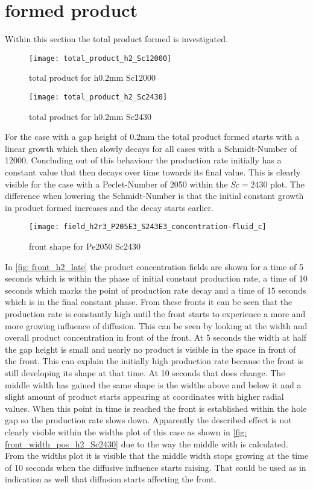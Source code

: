\documentclass[../thesis.tex]{subfiles}
\begin{document}
\section{formed product}

Within this section the total product formed is investigated.

\begin{figure}[htbp]
	\centering
	\texttt{[image: total\_product\_h2\_Sc12000]}
	\caption{total product for h0.2mm Sc12000\label{fig: total_prod_h2_Sc12000}}\bigskip
	\texttt{[image: total\_product\_h2\_Sc2430]}
	\caption{total product for h0.2mm Sc2430\label{fig: total_prod_h2_Sc2430}}
\end{figure}

For the case with a gap height of 0.2mm the total product formed starts with a linear growth which then slowly decays for all cases with a Schmidt-Number of 12000. Concluding out of this behaviour the production rate initially has a constant value that then decays over time towards its final value. This is clearly visible for the case with a Peclet-Number of 2050 within the $Sc = 2430$ plot. The difference when lowering the Schmidt-Number is that the initial constant growth in product formed increases and the decay starts earlier.
\begin{figure}[htb]
	\centering
	\texttt{[image: field\_h2r3\_P205E3\_S243E3\_concentration-fluid\_c]}
	\caption{front shape for Pe2050 Sc2430}
	\label{fig: front_h2_late}
\end{figure}
In \autoref{fig: front_h2_late} the product concentration fields are shown for a time of 5 seconds which is within the phase of initial constant production rate, a time of 10 seconds which marks the point of production rate decay and a time of 15 seconds which is in the final constant phase. From these fronts it can be seen that the production rate is constantly high until the front starts to experience a more and more growing influence of diffusion. This can be seen by looking at the width and overall product concentration in front of the front. At 5 seconds the width at half the gap height is small and nearly no product is visible in the space in front of the front. This can explain the initially high production rate because the front is still developing its shape at that time. At 10 seconds that does change. The middle width has gained the same shape is the widths above and below it and a slight amount of product starts appearing at coordinates with higher radial values. When this point in time is reached the front is established within the hole gap so the production rate slows down. Apparently the described effect is not clearly visible within the widths plot of this case as shown in \autoref{fig: front_width_pos_h2_Sc2430} due to the way the middle with is calculated. From the widths plot it is visible that the middle width stops growing at the time of 10 seconds when the diffusive influence starts raising. That could be used as in indication as well that diffusion starts affecting the front.
\end{document}
